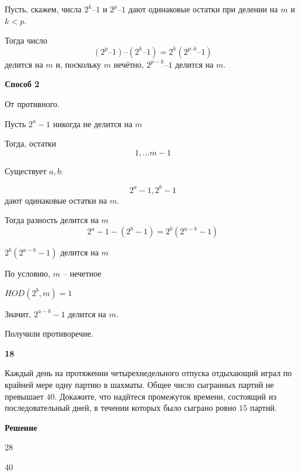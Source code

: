 \documentclass{article}
\begin{document}
Пусть, скажем, числа  $2^k – 1$  и  $2^p – 1$  дают одинаковые остатки при делении на $m$ и  $k < p$.  

Тогда число  $$(2^p – 1) – (2^k – 1) = 2^k(2^{p–k} – 1)$$  делится на $m$ и, поскольку $m$ нечётно,  $2^{p - k} – 1$  делится на $m$.

\textbf{Способ 2}

От противного. 

Пусть $2^a - 1$ никогда не делится на  $m$

Тогда, остатки $$ 1, ... m- 1$$

Существует $a, b$:

$$2^a - 1, 2^b - 1$$ 
дают одинаковые остатки на $m$.

Тогда разность делится на $m$
$$2^a - 1 - (2^b - 1) = 2^b (2^{a -b} - 1)$$

$2^b (2^{a -b} - 1)$ делится на $m$

По условию, $m$ -- нечетное

$HOD(2^ b, m) = 1$ 

Значит, $2^{a -b} - 1$ делится на $m$.

Получили противоречие.



\newpage

\textbf{18}

Каждый день на протяжении четырехнедельного отпуска отдыхающий играл по крайней мере одну партию в шахматы. Общее число сыгранных партий не превышает $40$. Докажите, что надйтеся промежуток времени, состоящий из последовательный дней, в течении которых было сыграно ровно  $15 $ партий. 

\textbf{Решение}


28 

40 
\end{document}
